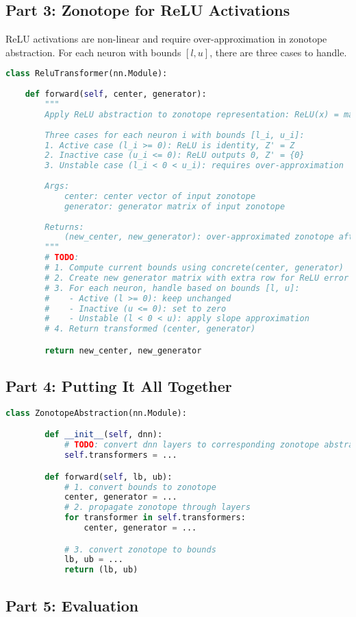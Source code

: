 \subsection{Part 3: Zonotope for ReLU Activations}

ReLU activations are non-linear and require over-approximation in zonotope abstraction. For each neuron with bounds $[l, u]$, there are three cases to handle.

\begin{lstlisting}[language=Python]
class ReluTransformer(nn.Module):
    
    def forward(self, center, generator):
        """
        Apply ReLU abstraction to zonotope representation: ReLU(x) = max(0, x)
        
        Three cases for each neuron i with bounds [l_i, u_i]:
        1. Active case (l_i >= 0): ReLU is identity, Z' = Z  
        2. Inactive case (u_i <= 0): ReLU outputs 0, Z' = {0}
        3. Unstable case (l_i < 0 < u_i): requires over-approximation
        
        Args:
            center: center vector of input zonotope
            generator: generator matrix of input zonotope  
            
        Returns:
            (new_center, new_generator): over-approximated zonotope after ReLU
        """
        # TODO:
        # 1. Compute current bounds using concrete(center, generator)
        # 2. Create new generator matrix with extra row for ReLU error
        # 3. For each neuron, handle based on bounds [l, u]:
        #    - Active (l >= 0): keep unchanged
        #    - Inactive (u <= 0): set to zero
        #    - Unstable (l < 0 < u): apply slope approximation
        # 4. Return transformed (center, generator)

        return new_center, new_generator

\end{lstlisting}

\subsection{Part 4: Putting It All Together}

\begin{lstlisting}[language=Python]
    class ZonotopeAbstraction(nn.Module):

        def __init__(self, dnn):
            # TODO: convert dnn layers to corresponding zonotope abstraction transformers
            self.transformers = ...

        def forward(self, lb, ub):
            # 1. convert bounds to zonotope
            center, generator = ...
            # 2. propagate zonotope through layers
            for transformer in self.transformers:
                center, generator = ...

            # 3. convert zonotope to bounds
            lb, ub = ...
            return (lb, ub)

\end{lstlisting}

\subsection{Part 5: Evaluation}
